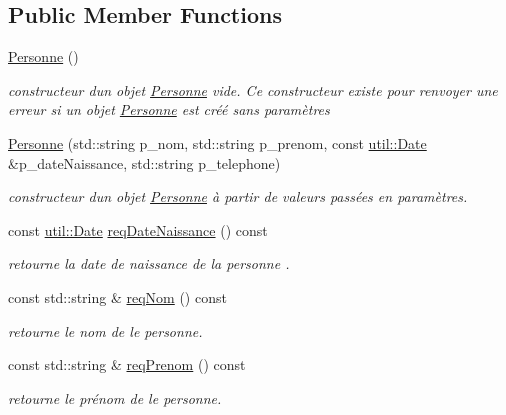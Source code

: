 \subsection*{Public Member Functions}
\begin{DoxyCompactItemize}
\item 
\mbox{\label{classhockey_1_1Personne_ad712e93d7629f8cab38821139d9dc2af}} 
\hyperlink{classhockey_1_1Personne_ad712e93d7629f8cab38821139d9dc2af}{Personne} ()
\begin{DoxyCompactList}\small\item\em constructeur d\textquotesingle{}un objet \hyperlink{classhockey_1_1Personne}{Personne} vide. Ce constructeur existe pour renvoyer une erreur si un objet \hyperlink{classhockey_1_1Personne}{Personne} est créé sans paramètres \end{DoxyCompactList}\item 
\hyperlink{classhockey_1_1Personne_ab38273cfbd7a665a10b20b5d44255482}{Personne} (std\+::string p\+\_\+nom, std\+::string p\+\_\+prenom, const \hyperlink{classutil_1_1Date}{util\+::\+Date} \&p\+\_\+date\+Naissance, std\+::string p\+\_\+telephone)
\begin{DoxyCompactList}\small\item\em constructeur d\textquotesingle{}un objet \hyperlink{classhockey_1_1Personne}{Personne} à partir de valeurs passées en paramètres. \end{DoxyCompactList}\item 
const \hyperlink{classutil_1_1Date}{util\+::\+Date} \hyperlink{classhockey_1_1Personne_ae9cb2402f8012b71959846a079986308}{req\+Date\+Naissance} () const
\begin{DoxyCompactList}\small\item\em retourne la date de naissance de la personne . \end{DoxyCompactList}\item 
const std\+::string \& \hyperlink{classhockey_1_1Personne_a0fdf8d98c481d17234c995bf67b57091}{req\+Nom} () const
\begin{DoxyCompactList}\small\item\em retourne le nom de le personne. \end{DoxyCompactList}\item 
const std\+::string \& \hyperlink{classhockey_1_1Personne_ae4257bc9fcd9f97d2a982797642401ee}{req\+Prenom} () const
\begin{DoxyCompactList}\small\item\em retourne le prénom de le personne. \end{DoxyCompactList}\item 

\end{DoxyCompactItemize}
